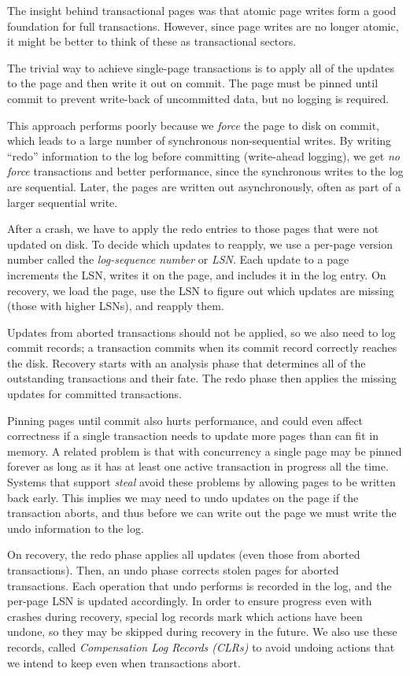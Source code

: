 \documentclass[letterpaper,twocolumn,10pt]{article}
\begin{document}
The insight behind transactional pages was
that atomic page writes form a good foundation for full transactions.
However, since page writes are no longer atomic, it might be
better to think of these as transactional sectors.

The trivial way to achieve single-page transactions is to apply all of
the updates to the page and then write it out on commit.  The page
must be pinned until commit to prevent write-back of uncommitted data,
but no logging is required.

This approach performs poorly because we {\em force} the page to disk
on commit, which leads to a large number of synchronous non-sequential
writes.  By writing ``redo'' information to the log before committing
(write-ahead logging), we get {\em no force} transactions and better
performance, since the synchronous writes to the log are sequential.
Later, the pages are written out asynchronously, often
as part of a larger sequential write.

After a crash, we have to apply the redo entries to those pages that
were not updated on disk.  To decide which updates to reapply, we use
a per-page version number called the {\em log-sequence number} or
{\em LSN}. Each update to a page increments the LSN, writes it on the
page, and includes it in the log entry.  On recovery, we 
load the page, use the LSN to figure out which updates are missing
(those with higher LSNs), and reapply them.

Updates from aborted transactions should not be applied, so we also
need to log commit records; a transaction commits when its commit
record correctly reaches the disk. Recovery starts with an analysis
phase that determines all of the outstanding transactions and their
fate.  The redo phase then applies the missing updates for committed
transactions.

Pinning pages until commit also hurts performance, and could even
affect correctness if a single transaction needs to update more pages
than can fit in memory. A related problem is that with concurrency a
single page may be pinned forever as long as it has at least one
active transaction in progress all the time.  Systems that support
{\em steal} avoid these problems by allowing pages to be written back
early.  This implies we may need to undo updates on the page if the
transaction aborts, and thus before we can write out the page we must
write the undo information to the log. 

On recovery, the redo phase applies all updates (even those from
aborted transactions).  Then, an undo phase corrects stolen pages for
aborted transactions.  Each operation that undo performs is recorded
in the log, and the per-page LSN is updated accordingly.  In order to
ensure progress even with crashes during recovery, special log records
mark which actions have been undone, so they may be skipped during
recovery in the future.  We also use these records, called {\em
Compensation Log Records (CLRs)} to avoid undoing actions that we
intend to keep even when transactions abort.
\end{document}
